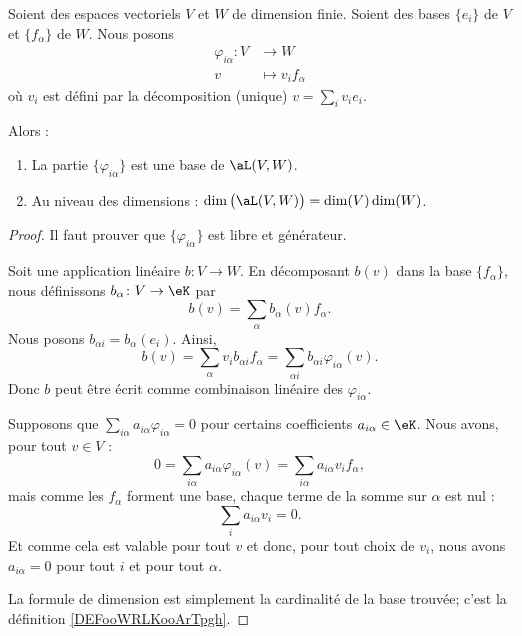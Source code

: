 \begin{lemma}       \label{LEMooJXFIooKDzRWR}
	Soient des espaces vectoriels \( V\) et \( W\) de dimension finie. Soient des bases \( \{e_i\}\) de \( V\) et \( \{f_{\alpha}\}\) de \( W\). Nous posons
	\begin{equation}
		\begin{aligned}
			\varphi_{i\alpha}\colon V & \to W                 \\
			v                         & \mapsto v_if_{\alpha}
		\end{aligned}
	\end{equation}
	où \( v_i\) est défini par la décomposition (unique) \( v=\sum_iv_ie_i\).

	Alors :
	\begin{enumerate}
		\item
		      La partie \( \{\varphi_{i\alpha}\} \) est une base de \( \aL(V,W)\).
		\item       \label{ITEMooPMLWooNbTyJI}
		      Au niveau des dimensions : \( \dim\big( \aL(V,W) \big)=\dim(V)\dim(W)\).
	\end{enumerate}
\end{lemma}

\begin{proof}
	Il faut prouver que \( \{\varphi_{i\alpha}\}\) est libre et générateur.

	\begin{subproof}
		\spitem[Générateur]
		Soit une application linéaire \( b\colon V\to W\). En décomposant \( b(v)\) dans la base \( \{f_{\alpha}\}\), nous définissons \( b_{\alpha}\colon V\to \eK\) par
		\begin{equation}
			b(v)=\sum_{\alpha}b_{\alpha}(v)f_{\alpha}.
		\end{equation}
		Nous posons \( b_{\alpha i}=b_{\alpha}(e_i)\). Ainsi,
		\begin{equation}
			b(v)=\sum_{\alpha}v_ib_{\alpha i}f_{\alpha}=\sum_{\alpha i}b_{\alpha i}\varphi_{i\alpha}(v).
		\end{equation}
		Donc \( b\) peut être écrit comme combinaison linéaire des \( \varphi_{i\alpha}\).

		\spitem[Libre]
		Supposons que \( \sum_{i\alpha}a_{i\alpha}\varphi_{i\alpha}=0\) pour certains coefficients \( a_{i\alpha}\in \eK\). Nous avons, pour tout \( v\in V\) :
		\begin{equation}
			0=\sum_{i\alpha}a_{i\alpha}\varphi_{i\alpha}(v)=\sum_{i\alpha}a_{i\alpha}v_if_{\alpha},
		\end{equation}
		mais comme les \( f_{\alpha}\) forment une base, chaque terme de la somme sur \( \alpha\) est nul :
		\begin{equation}
			\sum_ia_{i\alpha}v_i=0.
		\end{equation}
		Et comme cela est valable pour tout \( v\) et donc, pour tout choix de \( v_i\), nous avons \( a_{i\alpha}=0\) pour tout \( i\) et pour tout \( \alpha\).
	\end{subproof}
	La formule de dimension est simplement la cardinalité de la base trouvée; c'est la définition \ref{DEFooWRLKooArTpgh}.
\end{proof}

